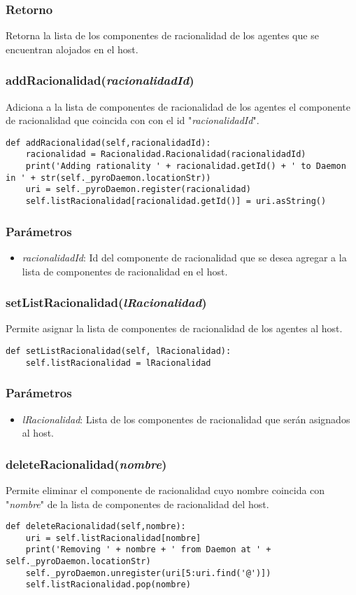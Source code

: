 \documentclass{article}
\begin{document}
\subsubsection*{Retorno}
Retorna la lista de los componentes de racionalidad de los agentes que se encuentran alojados en el host.
\subsubsection{\textbf{addRacionalidad}(\textit{racionalidadId})}
Adiciona a la lista de componentes de racionalidad de los agentes el componente de racionalidad que coincida con con el id "\textit{racionalidadId}".
\begin{lstlisting}
def addRacionalidad(self,racionalidadId):
	racionalidad = Racionalidad.Racionalidad(racionalidadId)
    print('Adding rationality ' + racionalidad.getId() + ' to Daemon in ' + str(self._pyroDaemon.locationStr))
	uri = self._pyroDaemon.register(racionalidad)
    self.listRacionalidad[racionalidad.getId()] = uri.asString()
\end{lstlisting}
\subsubsection*{Parámetros}
\begin{itemize}
\item \textit{racionalidadId}: Id del componente de racionalidad que se desea agregar a la lista de componentes de racionalidad en el host.
\end{itemize}
\subsubsection{\textbf{setListRacionalidad}(\textit{lRacionalidad})}
Permite asignar la lista de componentes de racionalidad de los agentes al host.
\begin{lstlisting}
def setListRacionalidad(self, lRacionalidad):
	self.listRacionalidad = lRacionalidad
\end{lstlisting}
\subsubsection*{Parámetros}
\begin{itemize}
\item \textit{lRacionalidad}: Lista de los componentes de racionalidad que serán asignados al host.
\end{itemize}
\subsubsection{\textbf{deleteRacionalidad}(\textit{nombre})}
Permite eliminar el componente de racionalidad cuyo nombre coincida con "\textit{nombre}" de la lista de componentes de racionalidad del host.
\begin{lstlisting}
def deleteRacionalidad(self,nombre):
	uri = self.listRacionalidad[nombre]
	print('Removing ' + nombre + ' from Daemon at ' + self._pyroDaemon.locationStr)
	self._pyroDaemon.unregister(uri[5:uri.find('@')])
	self.listRacionalidad.pop(nombre)
\end{lstlisting}
\end{document}
